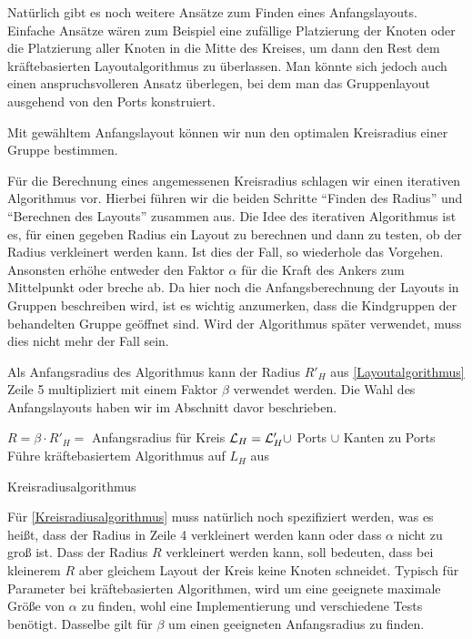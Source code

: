 Natürlich gibt es  noch weitere Ansätze zum Finden eines Anfangslayouts.
Einfache Ansätze wären zum Beispiel eine zufällige Platzierung der Knoten oder die Platzierung aller Knoten in die Mitte des Kreises, 
um dann den Rest dem kräftebasierten Layoutalgorithmus zu überlassen. 
Man könnte sich jedoch auch einen anspruchsvolleren Ansatz überlegen, bei dem man das Gruppenlayout ausgehend von den Ports konstruiert.

Mit gewähltem Anfangslayout können wir nun den optimalen Kreisradius einer Gruppe bestimmen.



Für die Berechnung eines angemessenen Kreisradius schlagen wir einen iterativen Algorithmus vor. \label{Radius}
Hierbei führen wir die beiden Schritte ``Finden des Radius'' und ``Berechnen des Layouts'' zusammen aus.
Die Idee des iterativen Algorithmus ist es, für einen gegeben Radius ein Layout zu berechnen und dann zu testen, ob der Radius verkleinert werden kann.
Ist dies der Fall, so wiederhole das Vorgehen. Ansonsten erhöhe entweder den Faktor $\alpha$ für die Kraft des Ankers zum Mittelpunkt oder breche ab. 
Da hier noch die Anfangsberechnung der Layouts in Gruppen beschreiben wird, ist es wichtig anzumerken, dass die Kindgruppen der behandelten Gruppe 
geöffnet sind.
Wird der Algorithmus später verwendet, muss dies nicht mehr der Fall sein.

Als Anfangsradius des Algorithmus kann der Radius $R'_H$ aus \autoref{Layoutalgorithmus} Zeile 5 multipliziert mit einem Faktor $\beta$ verwendet werden.
Die Wahl des Anfangslayouts haben wir im Abschnitt davor beschrieben.

\vspace{1cm}

\begin{algorithm}[H]
\SetAlgoLined
{}
$R = \beta \cdot R'_H = $ Anfangsradius für Kreis\;
$\mathcal{L}_H = \mathcal{L}'_H \cup$ Ports $\cup$  Kanten zu Ports\;
Führe kräftebasiertem Algorithmus auf  $L_H$ aus\;
\caption{Kreisradiusalgorithmus}
\label{Kreisradiusalgorithmus}
\end{algorithm}

Für \autoref{Kreisradiusalgorithmus} muss natürlich noch spezifiziert werden, was es heißt, dass der Radius in Zeile 4 verkleinert werden kann
oder dass $\alpha$ nicht zu groß ist. 
Dass der Radius $R$ verkleinert werden kann, soll bedeuten, dass bei kleinerem $R$ aber gleichem Layout der Kreis keine Knoten schneidet. 
Typisch für Parameter bei kräftebasierten Algorithmen, wird um eine geeignete maximale Größe von $\alpha$ zu finden, wohl eine Implementierung und verschiedene Tests benötigt. 
Dasselbe gilt für $\beta$ um einen geeigneten Anfangsradius zu finden.

